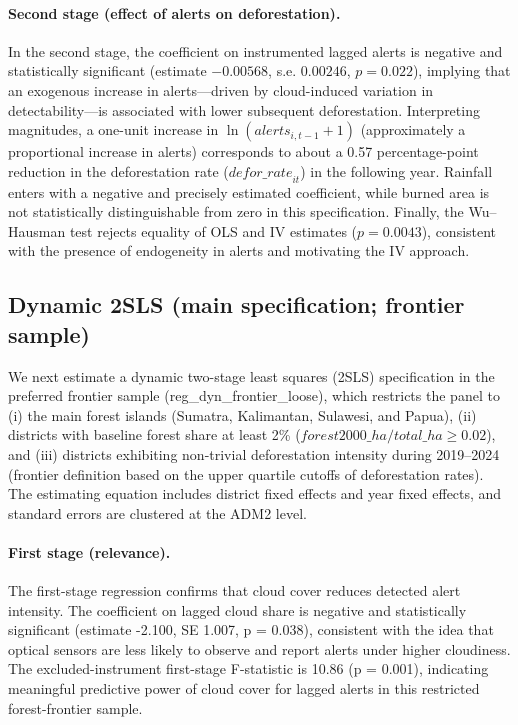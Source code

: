 \documentclass[hidelinks,12pt]{article}
\begin{document}
\paragraph{Second stage (effect of alerts on deforestation).}
In the second stage, the coefficient on instrumented lagged alerts is negative and statistically significant (estimate $-0.00568$, s.e. $0.00246$, $p=0.022$), implying that an exogenous increase in alerts—driven by cloud-induced variation in detectability—is associated with lower subsequent deforestation. Interpreting magnitudes, a one-unit increase in $\ln(\textit{alerts}_{i,t-1}+1)$ (approximately a proportional increase in alerts) corresponds to about a 0.57 percentage-point reduction in the deforestation rate ($\textit{defor\_rate}_{it}$) in the following year. Rainfall enters with a negative and precisely estimated coefficient, while burned area is not statistically distinguishable from zero in this specification. Finally, the Wu–Hausman test rejects equality of OLS and IV estimates ($p=0.0043$), consistent with the presence of endogeneity in alerts and motivating the IV approach.


\subsection{Dynamic 2SLS (main specification; frontier sample)}
\label{main2sls}
We next estimate a dynamic two-stage least squares (2SLS) specification in the preferred frontier sample (reg\_dyn\_frontier\_loose), which restricts the panel to (i) the main forest islands (Sumatra, Kalimantan, Sulawesi, and Papua), (ii) districts with baseline forest share at least 2\% ($forest2000\_ha/total\_ha \ge 0.02$), and (iii) districts exhibiting non-trivial deforestation intensity during 2019–2024 (frontier definition based on the upper quartile cutoffs of deforestation rates). The estimating equation includes district fixed effects and year fixed effects, and standard errors are clustered at the ADM2 level.

\paragraph{First stage (relevance).}
The first-stage regression confirms that cloud cover reduces detected alert intensity. The coefficient on lagged cloud share is negative and statistically significant (estimate -2.100, SE 1.007, p = 0.038), consistent with the idea that optical sensors are less likely to observe and report alerts under higher cloudiness. The excluded-instrument first-stage F-statistic is 10.86 (p = 0.001), indicating meaningful predictive power of cloud cover for lagged alerts in this restricted forest-frontier sample.
\end{document}
